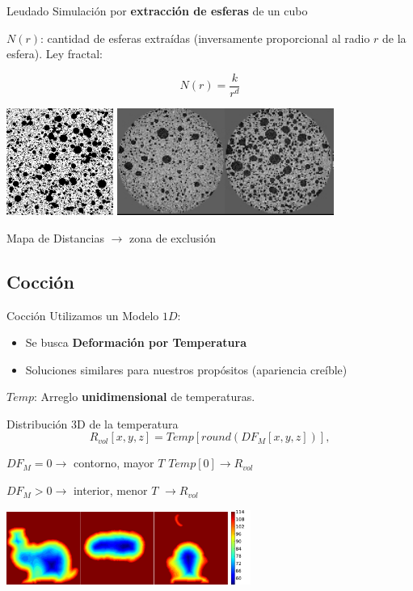 \documentclass[spanish,unknownkeysallowed,10pt]{beamer}
\begin{document}
\begin{frame}{Leudado}
Simulación por \textbf{extracción de esferas} de un cubo

$N(r)$: cantidad de esferas extraídas (inversamente proporcional al radio $r$ de la esfera). Ley fractal:

\begin{equation*}
N(r) = \frac{k}{r^{d}}
\end{equation*}

\vspace{0.3cm}
\centering
\includegraphics[height=3.5cm]{../figures/bubbles}
\includegraphics[height=3.5cm]{../figures/proving}

Mapa de Distancias $\rightarrow$ zona de exclusión
\end{frame}

\subsection{Cocción}

\begin{frame}{Cocción}
Utilizamos un Modelo $1D$:
\begin{itemize}
\item Se busca \textbf{Deformación por Temperatura}
\item Soluciones similares para nuestros propósitos (apariencia creíble)
\end{itemize}

$Temp$: Arreglo \textbf{unidimensional} de temperaturas.

Distribución 3D de la temperatura
\begin{equation*}
\displaystyle R_{vol}[x,y,z] = Temp[ round( DF_{M}[x,y,z] ) ], 
\end{equation*}

$DF_{M} = 0 \rightarrow$ contorno, mayor $T$ $Temp[0] \rightarrow R_{vol}$

$DF_{M} > 0 \rightarrow$ interior, menor $T$  $\rightarrow R_{vol}$

\centerline{\includegraphics[width=8cm]{../figures/tempsbunny}}
\end{frame}
\end{document}
